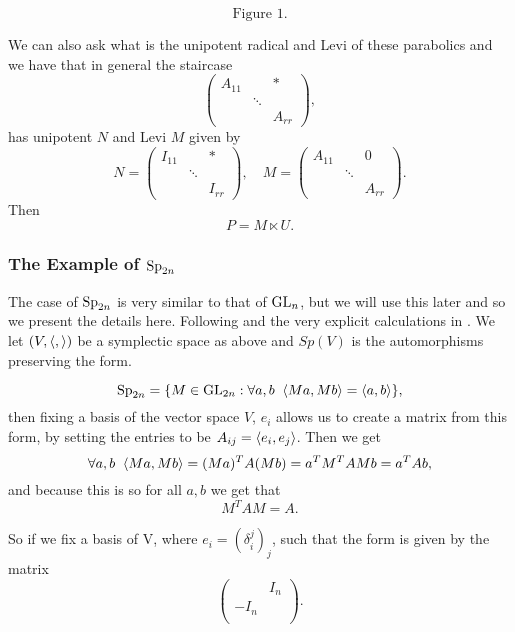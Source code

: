     \[\text{Figure 1.}\]

    We can also ask what is the unipotent radical and Levi of these parabolics and we have that in general the staircase 
   \[\begin{pmatrix}
       A_{11} && \ast\\
        & \ddots & \\
        && A_{rr}
   \end{pmatrix},\]
   has unipotent \(N\) and Levi \(M\) given by 
   \[N = \begin{pmatrix}
       I_{11} && \ast\\
        & \ddots & \\
        && I_{rr}
   \end{pmatrix}, \quad M = \begin{pmatrix}
       A_{11} && 0\\
        & \ddots & \\
        && A_{rr}
   \end{pmatrix}.\]
   Then 
   \[P = M\ltimes U.\]

\subsubsection{The Example of \(\operatorname{Sp}_{2n}\)}
The case of \(\operatorname{Sp}_{2n}\) is very similar to that of \(\operatorname{GL}_n\), but we will use this later and so we present the details here. Following \cite{conradStandardParabolicSubgroups} and the very explicit calculations in  \cite[\S 8]{BuildingsClassicalGroups}. We let \((V, \langle ,\rangle)\) be a symplectic space as above and \(Sp(V)\) is the automorphisms preserving the form.
\begin{example}
    \[\operatorname{Sp}_{2n} = \{M\in \operatorname{GL}_{2n} :\forall a,b \;\; \langle Ma, Mb\rangle = \langle a,b\rangle\},\]
    then fixing a basis of the vector space \(V\), \(e_i\) allows us to create a matrix from this form, by setting the entries to be \(A_{ij} = \langle e_i, e_j\rangle\). Then we get 
        \[\forall a,b \;\; \langle Ma, Mb\rangle = (Ma)^T A (Mb) = a^T M^T A M b= a^TAb, \]
        and because this is so for all \(a,b\) we get that 
        \[M^T A M = A.\]

        So if we fix a basis of V, where \(e_i = (\delta_i^j)_j\), such that the form is given by the matrix
        \[\begin{pmatrix}
             & I_n \\
            -I_n & \\
        \end{pmatrix}.\]
\end{example}

